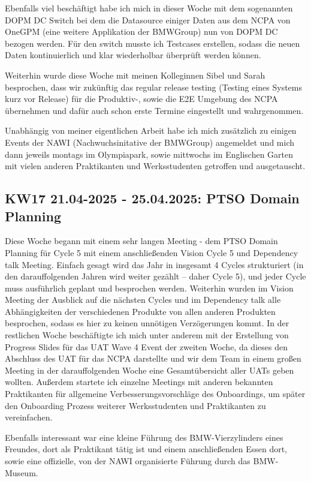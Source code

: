 Ebenfalls viel beschäftigt habe ich mich in dieser Woche mit dem sogenannten \ac{DOPM DC} Switch bei dem die Datasource einiger Daten aus dem \ac{NCPA} von \ac{OneGPM} (eine weitere Applikation der BMWGroup) nun von \ac{DOPM DC} bezogen werden. 
Für den switch musste ich Testcases erstellen, sodass die neuen Daten kontinuierlich und klar wiederholbar überprüft werden können.

Weiterhin wurde diese Woche mit meinen Kolleginnen Sibel und Sarah besprochen, dass wir zukünftig das regular release testing (Testing eines Systems kurz vor Release) für die Produktiv-, sowie die \ac{E2E} Umgebung des \ac{NCPA} übernehmen und dafür auch schon erste Termine eingestellt und wahrgenommen.

Unabhängig von meiner eigentlichen Arbeit habe ich mich zusätzlich zu einigen Events der \ac{NAWI} (Nachwuchsinitative der BMWGroup) angemeldet und mich dann jeweils montags im Olympiapark, sowie mittwochs im Englischen Garten mit vielen anderen Praktikanten und Werksstudenten getroffen und ausgetauscht.


\subsection{KW17 21.04-2025 - 25.04.2025: PTSO Domain Planning}
Diese Woche begann mit einem sehr langen Meeting - dem PTSO Domain Planning für Cycle 5 mit einem anschließenden Vision Cycle 5 und Dependency talk Meeting. 
Einfach gesagt wird das Jahr in insgesamt 4 Cycles strukturiert (in den darauffolgenden Jahren wird weiter gezählt – daher Cycle 5), und jeder Cycle muss ausführlich geplant und besprochen werden. 
Weiterhin wurden im Vision Meeting der Ausblick auf die nächsten Cycles und im Dependency talk alle Abhängigkeiten der verschiedenen Produkte von allen anderen Produkten besprochen, sodass es hier zu keinen unnötigen Verzögerungen kommt. 
In der restlichen Woche beschäftigte ich mich unter anderem mit der Erstellung von Progress Slides für das \ac{UAT} Wave 4 Event der zweiten Woche, da dieses den Abschluss des \ac{UAT} für das \ac{NCPA} darstellte und wir dem Team in einem großen Meeting in der darauffolgenden Woche eine Gesamtübersicht aller \acp{UAT} geben wollten. 
Außerdem startete ich einzelne Meetings mit anderen bekannten Praktikanten für allgemeine Verbesserungsvorschläge des Onboardings, um später den Onboarding Prozess weiterer Werksstudenten und Praktikanten zu vereinfachen.

Ebenfalls interessant war eine kleine Führung des BMW-Vierzylinders eines Freundes, dort als Praktikant tätig ist und einem anschließenden Essen dort, sowie eine offizielle, von der \ac{NAWI} organisierte Führung durch das BMW-Museum.


